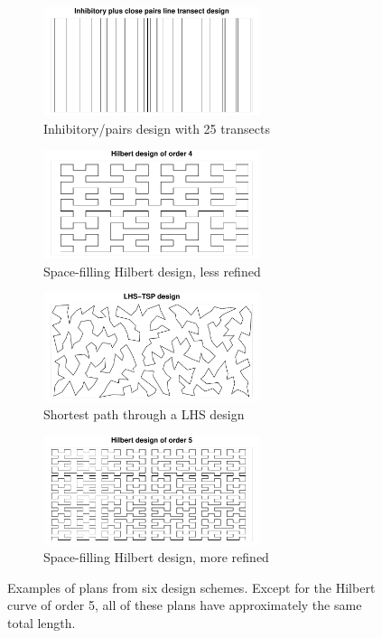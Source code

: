 \documentclass[review]{elsarticle}
\begin{document}
\begin{figure}
\begin{subfigure}{2.5in}
\includegraphics[width=2.5in]{../graphics/Inhib000171.pdf}
\caption{Inhibitory/pairs design with 25 transects}
\label{inhib000171}
\end{subfigure}
\begin{subfigure}{2.5in}
\includegraphics[width=2.5in]{../graphics/Hilbert000180.pdf}
\caption{Space-filling Hilbert design, less refined}
\label{hilbert000180}
\end{subfigure}

\begin{subfigure}{2.5in}
\includegraphics[width=2.5in]{../graphics/LHS-TSP000161.pdf}
\caption{Shortest path through a LHS design}
\label{lhstsp000161}
\end{subfigure}
\begin{subfigure}{2.5in}
\includegraphics[width=2.5in]{../graphics/Hilbert000237.pdf}
\caption{Space-filling Hilbert design, more refined}
\label{hilbert000237}
\end{subfigure}

\caption{Examples of plans from six design schemes. Except for the Hilbert
curve of order 5, all of these plans have approximately the same total length.}
\label{plancomparison}
\end{figure}
\end{document}
